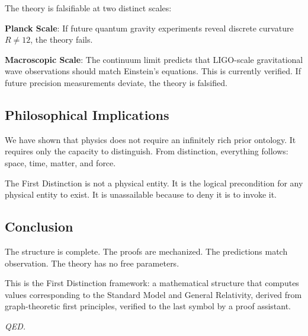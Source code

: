 \documentclass[11pt,a4paper]{book}
\begin{document}
The theory is falsifiable at two distinct scales:

\textbf{Planck Scale}: If future quantum gravity experiments reveal discrete curvature $R \neq 12$, the theory fails.

\textbf{Macroscopic Scale}: The continuum limit predicts that LIGO-scale gravitational wave observations should match Einstein's equations. This is currently verified. If future precision measurements deviate, the theory is falsified.

\subsection{Philosophical Implications}

We have shown that physics does not require an infinitely rich prior ontology. 
It requires only the capacity to distinguish. From distinction, everything follows: space, time, matter, and force.

The First Distinction is not a physical entity. It is the logical precondition for any physical entity to exist. It is unassailable because to deny it is to invoke it.

\subsection{Conclusion}

The structure is complete. The proofs are mechanized. The predictions match observation. The theory has no free parameters.

This is the First Distinction framework: a mathematical structure that computes values corresponding to the Standard Model and General Relativity, derived from graph-theoretic first principles, verified to the last symbol by a proof assistant.

\textit{QED.}
\end{document}
